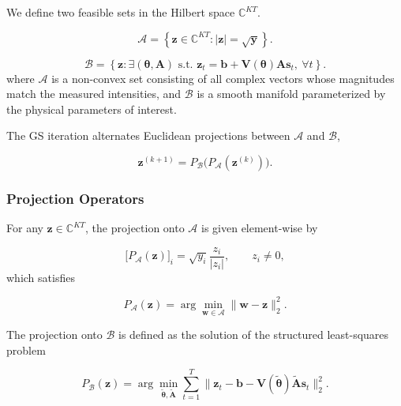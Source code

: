 \documentclass[journal]{IEEEtran}
\begin{document}
We define two feasible sets in the Hilbert space $\mathbb C^{KT}$.

\begin{equation}
\mathcal A = \left\{ \mathbf z\in\mathbb C^{KT} : |\mathbf z|=\sqrt{\mathbf y}
\right\}.
\end{equation}

\begin{equation}
\mathcal B = \left\{ \mathbf z : \exists (\boldsymbol\theta,\mathbf A) \text{ s.t. } \mathbf z_t= \mathbf b+ \mathbf V(\boldsymbol\theta)\mathbf A\mathbf s_t, ~\forall t \right\}.
\end{equation}
where $\mathcal A$ is a non-convex set consisting of all complex vectors whose magnitudes match the measured intensities, and $\mathcal B$ is a smooth manifold parameterized by the physical parameters of interest.

The GS iteration alternates Euclidean projections between $\mathcal A$ and
$\mathcal B$,

\begin{equation}
\mathbf z^{(k+1)}
=
P_{\mathcal B}
\big(
P_{\mathcal A}(\mathbf z^{(k)})
\big).
\end{equation}

\subsubsection{Projection Operators}

For any $\mathbf z\in\mathbb C^{KT}$, the projection onto $\mathcal A$ is given
element-wise by

\begin{equation}
\big[P_{\mathcal A}(\mathbf z)\big]_i = \sqrt{y_i} \frac{z_i}{|z_i|}, \qquad z_i\neq 0,
\end{equation}
which satisfies

\begin{equation} 
    P_{\mathcal A}(\mathbf z) = \arg\min_{\mathbf w\in\mathcal A} \|\mathbf w-\mathbf z\|_2^2 .
\end{equation}

The projection onto $\mathcal B$ is defined as the solution of the structured
least-squares problem

\begin{equation}
P_{\mathcal B}(\mathbf z)
=
\arg\min_{\tilde{\boldsymbol\theta},\tilde{\mathbf A}}
\sum_{t=1}^{T}
\big\|
\mathbf z_t
-
\mathbf b-
\mathbf V(\tilde{\boldsymbol\theta})
\tilde{\mathbf A}
\mathbf s_t
\big\|_2^2 .
\end{equation}
\end{document}
